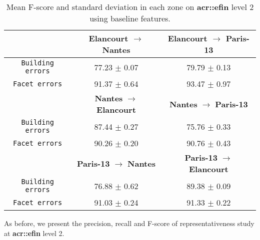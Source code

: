         \begin{table}[htbp]
            \footnotesize
            \centering
            \begin{tabular}{c c c}
                \toprule
                & \textbf{Elancourt} \(\rightarrow\) \textbf{Nantes} & \textbf{Elancourt} \(\rightarrow\) \textbf{Paris-13} \\
                \midrule
                \texttt{Building errors} & 77.23 $\pm$ 0.07 & 79.79 $\pm$ 0.13 \\
                \midrule
                \texttt{Facet errors} & 91.37 $\pm$ 0.64 & 93.47 $\pm$ 0.97 \\
                \bottomrule
                \toprule
                & \textbf{Nantes} \(\rightarrow\) \textbf{Elancourt} & \textbf{Nantes} \(\rightarrow\) \textbf{Paris-13} \\
                \texttt{Building errors} & 87.44 $\pm$ 0.27 & 75.76 $\pm$ 0.33 \\
                \midrule
                \texttt{Facet errors} & 90.26 $\pm$ 0.20 & 90.76 $\pm$ 0.43 \\
                \bottomrule
                \toprule
                & \textbf{Paris-13} \(\rightarrow\) \textbf{Nantes} & \textbf{Paris-13} \(\rightarrow\) \textbf{Elancourt} \\
                \texttt{Building errors} & 76.88 $\pm$ 0.62 & 89.38 $\pm$ 0.09 \\
                \midrule
                \texttt{Facet errors} & 91.03 $\pm$ 0.24 & 91.33 $\pm$ 0.22 \\
                \bottomrule
            \end{tabular}
            \caption{
                \label{tab::f_score_transferability_f2}
                Mean F-score and standard deviation in each zone on \textbf{\gls{acr::efin}} level 2 using baseline features.
            }
        \end{table}

        As before, we present the precision, recall and F-score of representativeness study at \textbf{\gls{acr::efin}} level 2.\\
        
